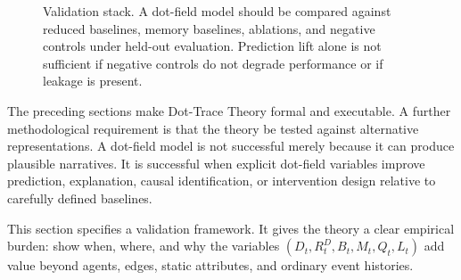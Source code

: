 \documentclass[11pt]{article}
\theoremstyle{remark}
\begin{document}
\begin{figure}[htbp]
\centering
{}
\caption{Validation stack. A dot-field model should be compared against reduced baselines, memory baselines, ablations, and negative controls under held-out evaluation. Prediction lift alone is not sufficient if negative controls do not degrade performance or if leakage is present.}
\label{fig:validation-stack}
\end{figure}


The preceding sections make Dot-Trace Theory formal and executable. A further methodological requirement is that the theory be tested against alternative
representations. A dot-field model is not successful merely because it can produce plausible narratives. It is successful when
explicit dot-field variables improve prediction, explanation, causal
identification, or intervention design relative to carefully defined baselines.

This section specifies a validation framework. It gives the theory a clear
empirical burden: show when, where, and why the variables
\((D_t,R_t^D,B_t,M_t,Q_t,L_t)\) add value beyond agents, edges, static
attributes, and ordinary event histories.
\end{document}
